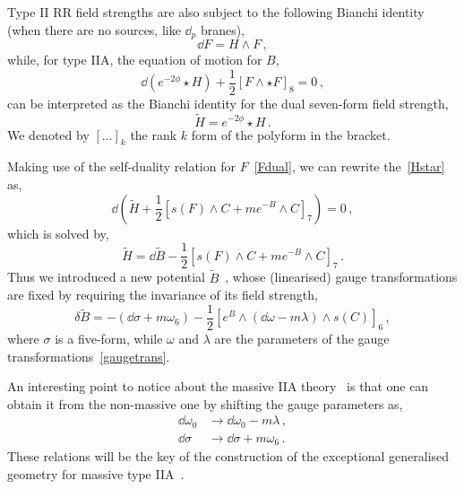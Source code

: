 \documentclass[debug]{phd}
\begin{document}
				Type II RR field strengths are also subject to the following Bianchi identity (when there are no sources, like $\dd_p$ branes),
						\begin{equation}
							\dd F = H \wedge F \, ,
						\end{equation}
				while, for type IIA, the equation of motion for $B$,
						\begin{equation}\label{Hstar}
							\dd (e^{-2\phi} \star H) + \frac{1}{2} \left[ F \wedge \star F \right]_8 = 0 \, ,
						\end{equation}
				can be interpreted as the Bianchi identity for the dual seven-form field strength,
						\begin{equation}
							\tilde{H} = e^{-2\phi} \star H \, .
						\end{equation}
				We denoted by $[\ldots]_k$ the rank $k$ form of the polyform in the bracket.

				Making use of the self-duality relation for $F$~\eqref{Fdual}, we can rewrite the~\eqref{Hstar} as,
						\begin{equation}
							\dd \left( \tilde H + \frac{1}{2} \left[ s(F) \wedge C + m e^{-B} \wedge C \right]_7 \right) = 0\, ,
						\end{equation}
				which is solved by,
						\begin{equation}
							\tilde H = \dd \tilde{B} - \frac{1}{2} \left[ s(F) \wedge C + m e^{-B} \wedge C \right]_7 \, .
						\end{equation}
				Thus we introduced a new potential $\tilde{B}$~\cite{Bergshoeff:1997ak, Bergshoeff:2006qw}, whose (linearised) gauge transformations are fixed by requiring the invariance of its field strength,
						\begin{equation}
							\delta \tilde{B} = -(\dd \sigma + m \omega_6) - \frac{1}{2} \left[ e^{B} \wedge (\dd \omega - m \lambda ) \wedge s(C) \right]_6 \, ,
						\end{equation}
				where $\sigma$ is a five-form, while $\omega$ and $\lambda$ are the parameters of the gauge transformations~\eqref{gaugetrans}.
				
				An interesting point to notice about the massive IIA theory~\cite{RomansMass} is that one can obtain it from the non-massive one by shifting the gauge parameters as,
						\begin{equation}\label{gaugeshifts}
							\begin{split}
								\dd \omega_0 &\longrightarrow \dd \omega_0 - m \lambda \, , \\
								\dd \sigma & \longrightarrow \dd \sigma + m \omega_6 \, .
							\end{split}
						\end{equation}
				These relations will be the key of the construction of the exceptional generalised geometry for massive type IIA~\cite{oscar1}.
				
\end{document}
